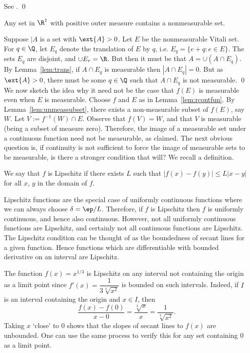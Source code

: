 \pf See \cite[p.~46]{wheedon}. \qed \\


\begin{lem} \label{lem:unmeassubset}
Any set in $\R^1$ with positive outer measure contains a nonmeasurable set.
\end{lem}

\pf Suppose $|A$ is a set with $\ext{A}>0$. Let $E$ be the nonmeasurable Vitali set. For $q \in \Q$, let $E_q$ denote the translation of $E$ by $q$, i.e. $E_q= \{ e+q \colon e \in E\}$. The sets $E_q$ are disjoint, and $\cup E_r= \R$. But then it must be that $A= \cup (A \cap E_q)$. By Lemma~\ref{lem:trans}, if $A \cap E_q$ is measurable then $|A \cap E_q|=0$. But as $\ext{A}>0$, there must be some $q \in \Q$ such that $A \cap E_q$ is not measurable. \qed \\


We now sketch the idea why it need not be the case that $f(E)$ is measurable even when $E$ is measurable. Choose $f$ and $E$ as in Lemma~\ref{lem:rcontfun}. By Lemma~\ref{lem:unmeassubset}, there exists a non-measurable subset of $f(E)$, say $W$. Let $V:= f^{-1}(W) \cap E$. Observe that $f(V)=W$, and that $V$ is measurable (being a subset of measure zero). Therefore, the image of a measurable set under a continuous function need not be measurable, as claimed. The next obvious question is, if continuity is not sufficient to force the image of measurable sets to be measurable, is there a stronger condition that will? We recall a definition. 


\begin{dfn}[Lipschitz]
We say that $f$ is Lipschitz if there exists $L$ such that $|f(x)-f(y)| \leq L|x-y|$ for all $x$, $y$ in the domain of $f$. 
\end{dfn}

Lipschitz functions are the special case of uniformly continuous functions where we can always choose $\delta=\ep/L$. Therefore, if $f$ is Lipschitz then $f$ is uniformly continuous, and hence also continuous. However, not all uniformly continuous functions are Lipschitz, and certainly not all continuous functions are Lipschitz. The Lipschitz condition can be thought of as the boundedness of secant lines for a given function. Hence functions which are differentiable with bounded derivative on an interval are Lipschitz. 

\begin{ex}
The function $f(x)= x^{1/3}$ is Lipschitz on any interval not containing the origin as a limit point since $f'(x)= \dfrac{1}{3 \sqrt[3]{x^2}}$ is bounded on such intervals. Indeed, if $I$ is an interval containing the origin and $x \in I$, then 
	\[
	\dfrac{f(x)-f(0)}{x-0}= \dfrac{\sqrt[3]{x}}{x}= \dfrac{1}{\sqrt[3]{x^2}}.
	\]
Taking $x$ `close' to 0 shows that the slopes of secant lines to $f(x)$ are unbounded. One can use the same process to verify this for any set containing 0 as a limit point. \xqed
\end{ex}

